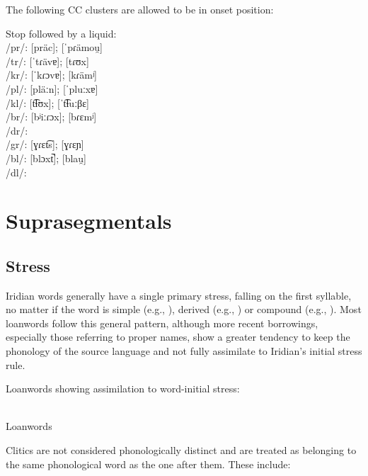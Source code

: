 \par The following CC clusters are allowed to be in onset position:

\pex
\a Stop followed by a liquid:\\
/pr/:  [pr\"ac];  [ˈpɾämou̯]\\
/tr/:  [ˈtɾävɐ];  [tɾʊx]\\
/kr/:  [ˈkɾɔvɐ];  [kɾämʲ]\\
/pl/:  [pläːn];  [ˈpluːxɐ]\\
/kl/:  [t͡ɬʊx];  [ˈt͡ɬuːβɛ]\\
/br/:  [bʲiːɾɔx];  [bɾɛmʲ]\\
/dr/: \\
/gr/:  [ɣɾɛt͡s];  [ɣɾɛɲ]\\
/bl/:  [blɔxt̚];  [blau̯]\\
/dl/:
\xe

\section{Suprasegmentals}

\subsection{Stress}
Iridian words generally have a single primary stress, falling on the first syllable, no matter if the word is simple (e.g., ), derived (e.g., ) or compound (e.g., ). Most loanwords follow this general pattern, although more recent borrowings, especially those referring to proper names, show a greater tendency to keep the phonology of the source language and not fully assimilate to Iridian's initial stress rule.

\pex
\a Loanwords showing assimilation to word-initial stress:\\
\\

\a Loanwords
\xe

Clitics are not considered phonologically distinct and are treated as belonging to the same phonological word as the one after them. These include:

